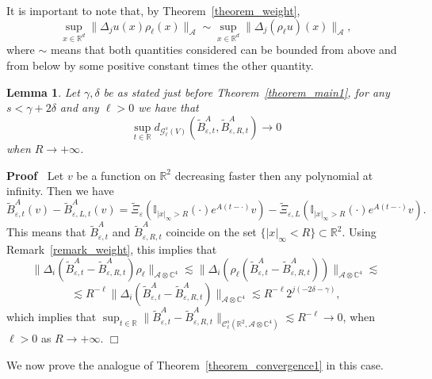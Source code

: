 \documentclass{article}
\newenvironment{proof}{\noindent\textbf{Proof\ }}{\hspace*{\fill}$\Box$\medskip}
\newtheorem{lemma}[theorem]{Lemma}
\begin{document}
\begin{remark}
  \label{remark_weight}It is important to note that, by
  Theorem~\ref{theorem_weight},
  \[ \sup_{x \in \mathbb{R}^d} \| \Delta_j u (x) \rho_{\ell} (x)
     \|_{\mathcal{A}} \sim \sup_{x \in \mathbb{R}^d} \| \Delta_j (\rho_{\ell}
     u) (x) \|_{\mathcal{A}}, \]
  where $\sim$ means that both quantities considered can be bounded from above
  and from below by some positive constant times the other quantity.
\end{remark}

\begin{lemma}
  \label{lemma_convergenceB}Let $\gamma, \delta$ be as stated just before
  Theorem~\ref{theorem_main1}, for any $s < \gamma + 2 \delta$ and any $\ell >
  0$ we have that
  \[ \sup_{t \in \mathbb{R}} d_{\mathcal{G}^s_{\ell} (V)}
     (\tilde{B}_{\varepsilon, t}^A, \tilde{B}^A_{\varepsilon, R, t})
     \rightarrow 0 \]
  when $R \rightarrow + \infty$.
\end{lemma}

\begin{proof}
  Let $v$ be a function on $\mathbb{R}^2$ decreasing faster then any
  polynomial at infinity. Then we have
  \[ \tilde{B}_{\varepsilon, t}^A (v) - \tilde{B}^A_{\varepsilon, L, t} (v) =
     \tilde{\Xi}_{\varepsilon} (\mathbb{I}_{| x |_{\infty} > R} (\cdot) e^{A
     (t - \cdot)} v) - \tilde{\Xi}_{\varepsilon, L} (\mathbb{I}_{| x
     |_{\infty} > R} (\cdot) e^{A (t - \cdot)} v) . \]
  This means that $\tilde{B}^A_{\varepsilon, t}$ and
  $\tilde{B}^A_{\varepsilon, R, t}$ coincide on the set $\{ | x |_{\infty} < R
  \} \subset \mathbb{R}^2$. Using Remark~\ref{remark_weight}, this implies
  that
  \[ \| \Delta_i (\tilde{B}_{\varepsilon, t}^A - \tilde{B}^A_{\varepsilon, R,
     t}) \rho_{\ell} \|_{\mathcal{A} \otimes \mathbb{C}^4} \lesssim \|
     \Delta_i (\rho_{\ell} (\tilde{B}_{\varepsilon, t}^A -
     \tilde{B}^A_{\varepsilon, R, t})) \|_{\mathcal{A} \otimes \mathbb{C}^4}
     \lesssim \]
  \[ \lesssim R^{- \ell} \| \Delta_i (\tilde{B}_{\varepsilon, t}^A -
     \tilde{B}^A_{\varepsilon, R, t}) \|_{\mathcal{A} \otimes \mathbb{C}^4}
     \lesssim R^{- \ell} 2^{j (- 2 \delta - \gamma)}, \]
  which implies that $\sup_{t \in \mathbb{R}} \| \tilde{B}_{\varepsilon, t}^A
  - \tilde{B}^A_{\varepsilon, R, t} \|_{\mathcal{C}^s_{\ell} (\mathbb{R}^2,
  \mathcal{A} \otimes \mathbb{C}^4)} \lesssim R^{- \ell} \rightarrow 0$, when
  $\ell > 0$ as $R \rightarrow + \infty$.
\end{proof}

We now prove the analogue of Theorem~\ref{theorem_convergence1} in this case.
\end{document}
